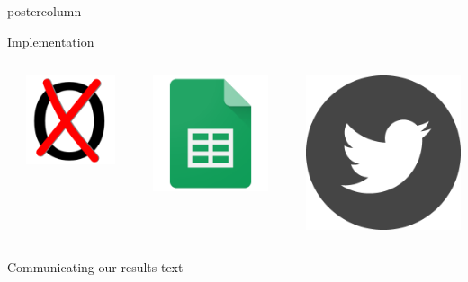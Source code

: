 \documentclass[final,hyperref={pdfpagelabels=false}]{beamer}
\newcommand*\circled[1]{\tikz[baseline=(char.base)]{
\node[shape=circle,draw,inner sep=2pt] (char) {#1};}}
\begin{document}
\begin{frame}
\begin{columns}
\begin{column}{1\textwidth}
\begin{columns}[T]
\begin{column}{.484\textwidth}
\begin{beamercolorbox}[center,wd=\textwidth]{postercolumn}
\begin{minipage}[T]{.95\textwidth}
\begin{block}{\footnotesize \circled{3} Implementation}
\begin{columns}[t]
  \hspace{-1.5ex}
  \textcolor{LMUlightgray}{\vrule{}}
  \hspace{1.5ex}

  \begin{column}{.15\textwidth}
  \begin{center}
  \includegraphics[height=5ex]{figures/hexSticker_icon}
  \end{center}
  \end{column}

  \hspace{-1.5ex}
  \textcolor{LMUlightgray}{\vrule{}}
  \hspace{1.5ex}

  \begin{column}{.15\textwidth}
  \begin{center}
  \includegraphics[height=5ex]{figures/implementation_sheets}
  \end{center}
  \end{column}

  \hspace{-1.5ex}
  \textcolor{LMUlightgray}{\vrule{}}
  \hspace{1.5ex}

  \begin{column}{.15\textwidth}
  \begin{center}
  \includegraphics[height=5ex]{figures/implementation_twitter}
  \end{center}
  \end{column}
\end{columns}
\end{block}

\begin{block}{\footnotesize \circled{4} Communicating our results}
text
\end{block}


\end{minipage}
\end{beamercolorbox}
\end{column}


\end{columns}
\end{column}
\end{columns}
\end{frame}
\end{document}
